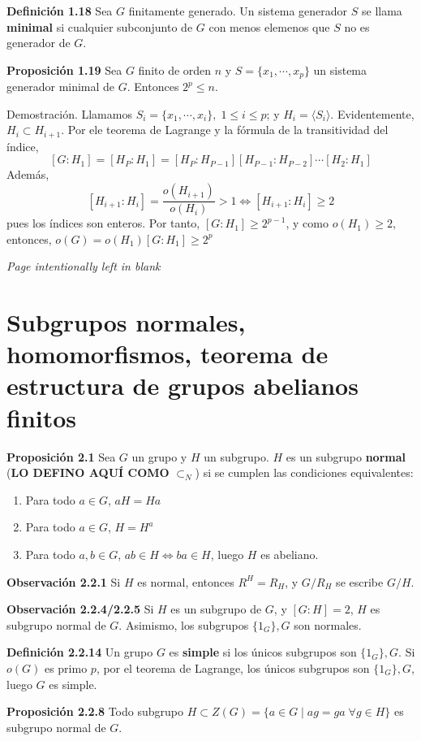 \documentclass[a4paper, 11pt]{extarticle}
\newcommand{\propo}[1]{\textcolor{rojo}{\textbf{Proposición #1}}}
\newcommand{\defi}[1]{\textcolor{azul}{\textbf{Definición #1}}}
\newcommand{\obs}[1]{\textcolor{verde}{\textbf{Observación #1}}}
\newcommand{\dem}[1]{\textcolor{gris}{\small{Demostración. #1}}}
\begin{document}
\defi{1.18} Sea \(G\) finitamente generado. Un sistema generador \(S\) se
llama \textbf{minimal} si cualquier subconjunto de \(G\) con menos elemenos que \(S\)
no es generador de \(G\).

\propo{1.19} Sea \(G\) finito de orden \(n\) y \(S = \{ x_1, \cdots, x_p \}\)
un
sistema generador minimal de \(G\). Entonces \(2^p \le n\).

\dem{ Llamamos \( S_i = \{ x_1, \cdots, x_i \}, \; 1 \le i \le p \); y \( H_i = \langle S_i \rangle \). 
Evidentemente, \( H_i \subset H_{i+1}
\). Por ele teorema de Lagrange y la fórmula de la transitividad del índice,
\[ [G:H_1] = [H_P:H_1] = [H_P:H_{P-1}][H_{P-1}:H_{P-2}]\cdots[H_2:H_1] \]
Además, 
\[ [H_{i+1}:H_i] = \frac{o(H_{i+1})}{o(H_i)} > 1 \iff
[H_{i+1}:H_i] \ge 2 \]
pues los índices son enteros.
Por tanto, \( [G:H_1] \ge 2^{p-1} \), y como \( o(H_1) \ge 2 \), entonces,
\( o(G) = o(H_1)[G:H_1] \ge 2^p \)
}

\pagebreak
\textcolor{gris}{\textit{Page intentionally left in blank}}
\newpage
\pagebreak


\section{Subgrupos normales, homomorfismos, teorema de estructura de grupos abelianos finitos}
\label{sec:org57b4ab6}
 \propo{2.1} Sea \(G\) un grupo y \(H\) un subgrupo. \(H\) es un subgrupo
\textbf{normal} (\textbf{LO DEFINO AQUÍ COMO} \(\subset_N\)) si se cumplen las condiciones equivalentes:
\begin{enumerate}
\item Para todo \(a  \in G\), \(aH = Ha\)
\item Para todo \(a \in G\), \(H = H^a\)
\item Para todo \(a,b \in G\), \(ab \in H \iff ba \in H\), luego \(H\) es
abeliano.
\end{enumerate}

\obs{2.2.1} Si \(H\) es normal, entonces \(R^H = R_H\), y \(G/R_H\) se
escribe \(G/H\).

\obs{2.2.4/2.2.5} Si \(H\) es un subgrupo de \(G\), y \([G:H] = 2\), \(H\) es subgrupo normal de \(G\). Asimismo, los subgrupos \(\{ 1_G \}, G\) son 
normales.

\defi{2.2.14} Un grupo \(G\) es \textbf{simple} si los únicos subgrupos son  \(\{ 1_G
\}, G\). Si \(o(G)\) es primo \(p\), por el teorema de Lagrange, los únicos
subgrupos son \(\{ 1_G \}, G\), luego \(G\) es simple.

\propo{2.2.8} Todo subgrupo \(H \subset Z(G) = \{ a \in G \;|\; ag = ga\;
\forall g \in
H\}\) es subgrupo normal de \(G\).
\end{document}
